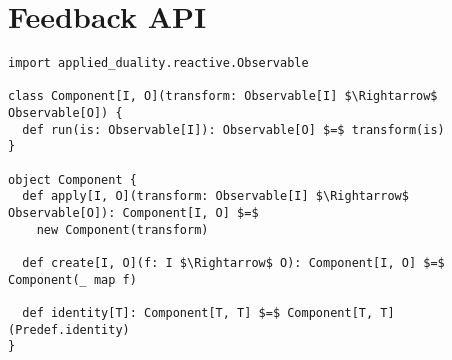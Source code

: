 \chapter{Feedback API}
\label{app:feedback-api}

\begin{lstlisting}[style=ScalaStyle, caption={\comp class}, label={lst:component-class}]
import applied_duality.reactive.Observable

class Component[I, O](transform: Observable[I] $\Rightarrow$ Observable[O]) {
  def run(is: Observable[I]): Observable[O] $=$ transform(is)
}

object Component {
  def apply[I, O](transform: Observable[I] $\Rightarrow$ Observable[O]): Component[I, O] $=$
    new Component(transform)

  def create[I, O](f: I $\Rightarrow$ O): Component[I, O] $=$ Component(_ map f)

  def identity[T]: Component[T, T] $=$ Component[T, T](Predef.identity)
}
\end{lstlisting}

